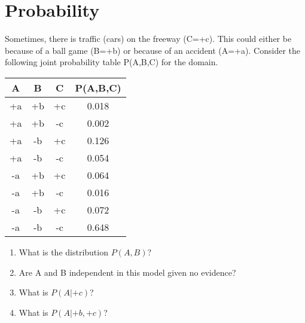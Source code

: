 \documentclass[12pt]{article}
\begin{document}
\clearpage

\section{Probability}

Sometimes, there is traffic (cars) on the freeway (C=+c).  This could
either be because of a ball game (B=+b) or because of an accident
(A=+a).  Consider the following joint probability table P(A,B,C) for
the domain.

\begin{center}
\begin{tabular}{|c|c|c|c|} \hline
A  & B  & C  & P(A,B,C) \\ \hline
+a & +b & +c & 0.018    \\ \hline
+a & +b & -c & 0.002    \\ \hline
+a & -b & +c & 0.126    \\ \hline
+a & -b & -c & 0.054    \\ \hline
-a & +b & +c & 0.064    \\ \hline
-a & +b & -c & 0.016    \\ \hline
-a & -b & +c & 0.072    \\ \hline
-a & -b & -c & 0.648    \\ \hline
\end{tabular}
\end{center}

  \begin{enumerate}

  \item What is the distribution $P(A,B)$? 

  \item Are A and B independent in this model given no evidence?

  \item What is $P(A|+c)$?

  \item What is $P(A|+b,+c)$?

  \end{enumerate}
\end{document}
